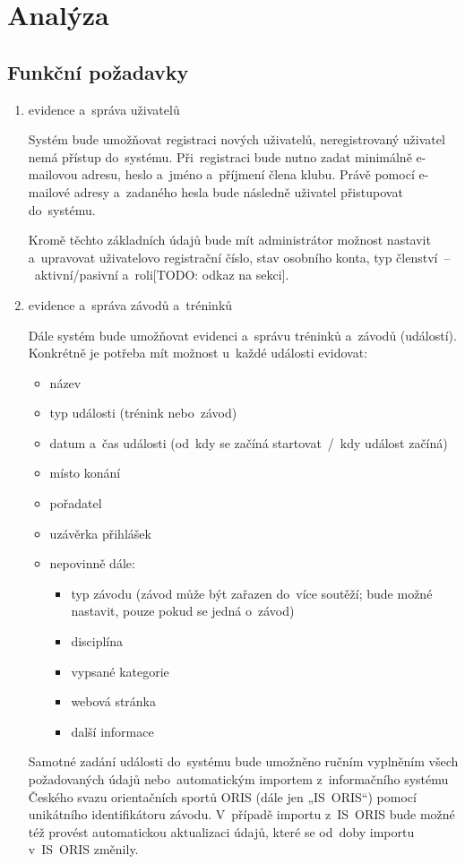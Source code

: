 \chapter{Analýza}
\section{Funkční požadavky}

\begin{enumerate}
	\item{evidence a~správa uživatelů}

Systém bude umožňovat registraci nových uživatelů, neregistrovaný uživatel nemá přístup do~systému. Při~registraci bude nutno zadat minimálně e-mailovou adresu, heslo a~jméno a~příjmení člena klubu. Právě pomocí e-mailové adresy a~zadaného hesla bude následně uživatel přistupovat do~systému.

Kromě těchto základních údajů bude mít administrátor možnost nastavit a~upravovat uživatelovo registrační číslo, stav osobního konta, typ členství~–~aktivní/pasivní a~roli[TODO: odkaz na sekci].

	\item evidence a~správa závodů a~tréninků

Dále systém bude umožňovat evidenci a~správu tréninků a~závodů (událostí). Konkrétně je potřeba mít možnost u~každé události evidovat:
\begin{itemize}
	\item název
	\item typ události (trénink nebo~závod)
	\item datum a~čas události (od~kdy se začíná startovat~/~kdy událost začíná)
	\item místo konání
	\item pořadatel
	\item uzávěrka přihlášek
	\item nepovinně dále:
	\begin{itemize}
		\item typ závodu (závod může být zařazen do~více soutěží; bude možné nastavit, pouze pokud se jedná o~závod)
		\item disciplína
		\item vypsané kategorie
		\item webová stránka
		\item další informace
	\end{itemize}
\end{itemize}

Samotné zadání události do~systému bude umožněno ručním vyplněním všech požadovaných údajů nebo~automatickým importem z~informačního systému Českého svazu orientačních sportů ORIS (dále jen „IS~ORIS“) pomocí unikátního identifikátoru závodu. V~případě importu z~IS~ORIS bude možné též provést automatickou aktualizaci údajů, které se od~doby importu v~IS~ORIS změnily.


\end{enumerate}

